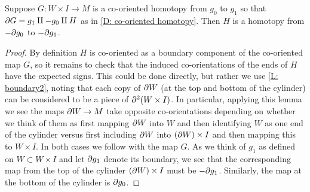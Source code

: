 \begin{lemma}\label{L: co-oriented homotopy}
	Suppose $G \colon W \times I \to M$ is a co-oriented homotopy from $g_0$ to $g_1$ so that $\partial G = g_1 \amalg -g_0\amalg H$ as in \cref{D: co-oriented homotopy}.
	Then $H$ is a homotopy from $-\partial g_0$ to $-\partial g_1$.
\end{lemma}

\begin{proof}
	By definition $H$ is co-oriented as a boundary component of the co-oriented map $G$, so it remains to check that the induced co-orientations of the ends of $H$ have the expected signs.
	This could be done directly, but rather we use \cref{L: boundary2}, noting that each copy of $\partial W$ (at the top and bottom of the cylinder) can be considered to be a piece of $\partial^2(W \times I)$.
	In particular, applying this lemma we see the maps $\partial W \to M$ take opposite co-orientations depending on whether we think of them as first mapping $\partial W$ into $W$ and then identifying $W$ as one end of the cylinder versus first including $\partial W$ into $(\partial W) \times I$ and then mapping this to $W \times I$.
	In both cases we follow with the map $G$.
	As we think of $g_1$ as defined on $W \subset W \times I$ and let $\partial g_1$ denote its boundary, we see that the corresponding map from the top of the cylinder $(\partial W) \times I$ must be $-\partial g_1$.
	Similarly, the map at the bottom of the cylinder is $\partial g_0$.
\end{proof}

